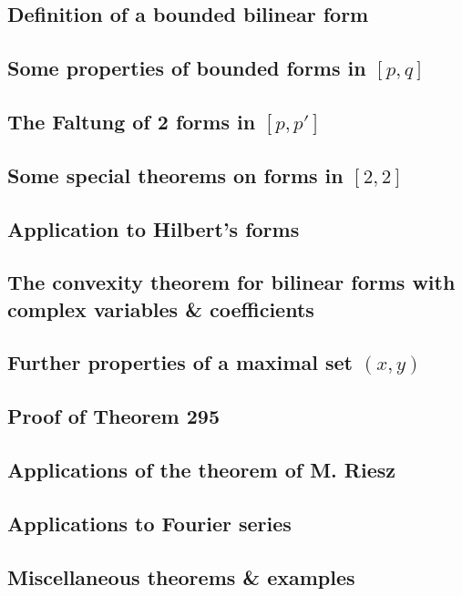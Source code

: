 \documentclass[oneside]{book}
\numberwithin{equation}{section}
\begin{document}
\subsection{Definition of a bounded bilinear form}

\subsection{Some properties of bounded forms in $[p,q]$}

\subsection{The Faltung of 2 forms in $[p,p']$}

\subsection{Some special theorems on forms in $[2,2]$}

\subsection{Application to Hilbert's forms}

\subsection{The convexity theorem for bilinear forms with complex variables \& coefficients}

\subsection{Further properties of a maximal set $(x,y)$}

\subsection{Proof of Theorem 295}

\subsection{Applications of the theorem of M. Riesz}

\subsection{Applications to Fourier series}

\subsection{Miscellaneous theorems \& examples}
\end{document}
